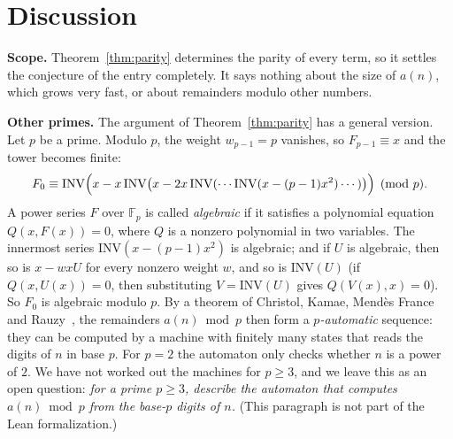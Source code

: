 \documentclass[11pt,a4paper]{article}
\theoremstyle{definition}
\theoremstyle{remark}
\newcommand{\F}{\mathbb{F}}
\newcommand{\para}[1]{\par\medskip\noindent\textbf{#1}\enspace}
\begin{document}
\section{Discussion}\label{sec:discussion}

\para{Scope.} Theorem~\ref{thm:parity} determines the parity of every term, so it settles the conjecture of the entry
completely. It says nothing about the size of $a(n)$, which grows very fast, or about remainders modulo other numbers.

\para{Other primes.} The argument of Theorem~\ref{thm:parity} has a general version. Let $p$ be a prime. Modulo $p$, the
weight $w_{p-1}=p$ vanishes, so $F_{p-1}\equiv x$ and the tower becomes finite:
\[
F_0\equiv\mathrm{INV}\Bigl(x-x\,\mathrm{INV}\bigl(x-2x\,\mathrm{INV}(\cdots\mathrm{INV}(x-(p-1)x^2)\cdots)\bigr)\Bigr)
\pmod p .
\]
A power series $F$ over $\F_p$ is called \emph{algebraic} if it satisfies a polynomial equation $Q(x,F(x))=0$, where $Q$
is a nonzero polynomial in two variables. The innermost series $\mathrm{INV}(x-(p-1)x^2)$ is algebraic; and if $U$ is
algebraic, then so is $x-wxU$ for every nonzero weight $w$, and so is $\mathrm{INV}(U)$ (if $Q(x,U(x))=0$, then
substituting $V=\mathrm{INV}(U)$ gives $Q(V(x),x)=0$). So $F_0$ is algebraic modulo $p$. By a theorem of Christol, Kamae,
Mend\`es France and Rauzy~\cite{christol,allouche}, the remainders $a(n)\bmod p$ then form a \emph{$p$-automatic}
sequence: they can be computed by a machine with finitely many states that reads the digits of $n$ in base $p$. For
$p=2$ the automaton only checks whether $n$ is a power of $2$. We have not worked out the machines for
$p\ge3$, and we leave this as an open question: \emph{for a prime $p\ge3$, describe the automaton that computes
$a(n)\bmod p$ from the base-$p$ digits of $n$.} (This paragraph is not part of the Lean formalization.)
\end{document}
